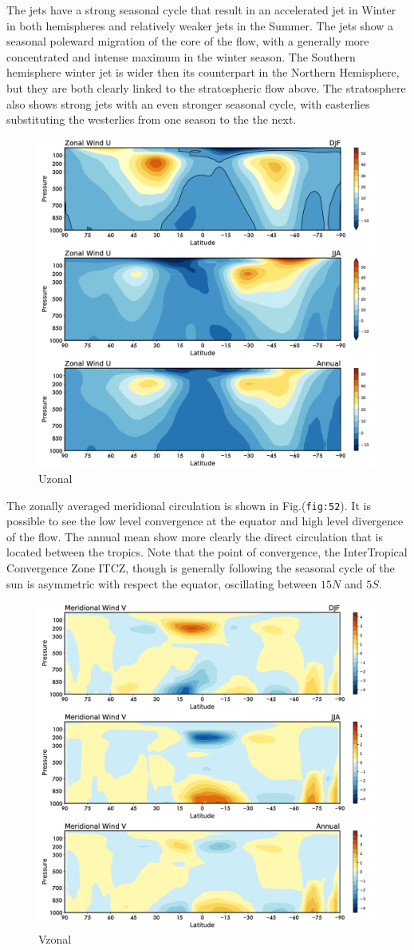 The jets have a strong seasonal cycle that result in an accelerated jet
in Winter in both hemispheres and relatively weaker jets in the Summer.
The jets show a seasonal poleward migration of the core of the flow,
with a generally more concentrated and intense maximum in the winter
season. The Southern hemisphere winter jet is wider then its counterpart
in the Northern Hemisphere, but they are both clearly linked to the
stratospheric flow above. The stratosphere also shows strong jets with
an even stronger seasonal cycle, with easterlies substituting the
westerlies from one season to the the next.

\begin{figure}[h!]
    \centering
    \includegraphics[width=0.5\linewidth]{uploads/Screenshot 2024-11-18 124309.png}
    \caption{Uzonal}
    \label{fig:Uzonal}
\end{figure}

The zonally averaged meridional circulation is shown in
Fig.(\texttt{fig:52}). It is possible to see the low level convergence
at the equator and high level divergence of the flow. The annual mean
show more clearly the direct circulation that is located between the
tropics. Note that the point of convergence, the InterTropical
Convergence Zone  ITCZ, though is generally following the seasonal
cycle of the sun is asymmetric with respect the equator, oscillating
between \(15N\) and \(5S\).

\begin{figure}[h!]
    \centering
    \includegraphics[width=0.5\linewidth]{uploads/Screenshot 2024-11-18 124445.png}
    \caption{Vzonal}
    \label{fig:Vzonal}
\end{figure}


